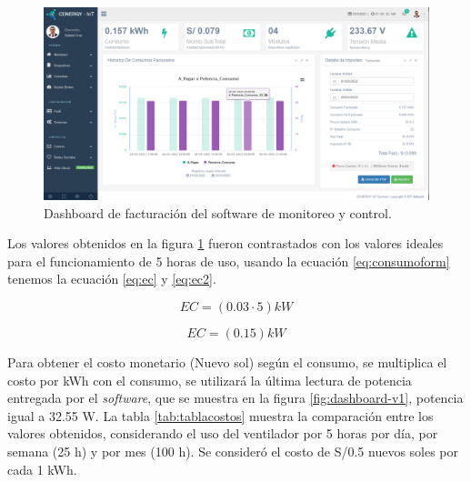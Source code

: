\begin{landscape} %
\begin{figure}[htpb]
\centering 
\includegraphics[width=1.7\textwidth]{./Figures/test/consumo/consumo.png}
\caption{Dashboard de facturación del software de monitoreo y control.}
\label{fig:dashboard-consumo}
\end{figure}
\end{landscape} %

Los valores obtenidos en la figura \ref{fig:dashboard-consumo} fueron contrastados con los valores ideales para el funcionamiento de 5 horas de uso, usando la ecuación \ref{eq:consumoform} tenemos la ecuación \ref{eq:ec} y \ref{eq:ec2}. 

\begin{equation}
	\label{eq:ec}
	EC = \left( 0.03 \cdot 5 \right) kW
\end{equation}

\begin{equation}
	\label{eq:ec2}
	EC = \left( 0.15 \right) kW
\end{equation}

Para obtener el costo monetario (Nuevo sol) según el consumo, se multiplica el costo por kWh con el consumo, se utilizará la última lectura de potencia entregada por el \emph{software}, que se muestra en la figura \ref{fig:dashboard-v1}, potencia igual a 32.55 W. La tabla \ref{tab:tablacostos} muestra la comparación entre los valores obtenidos, considerando el uso del ventilador por 5 horas por día, por semana (25 h) y por mes (100 h). Se consideró el costo de S/0.5 nuevos soles por cada 1 kWh.

